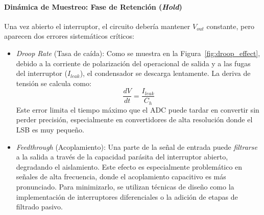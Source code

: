 \paragraph{Dinámica de Muestreo: Fase de Retención (\textit{Hold})}
Una vez abierto el interruptor, el circuito debería mantener $V_{out}$ constante, pero aparecen dos errores sistemáticos críticos:
\begin{itemize}
    \item \emph{Droop Rate} (Tasa de caída): Como se muestra en la Figura~\ref{fig:droop_effect}, debido a la corriente de polarización del operacional de salida y a las fugas del interruptor ($I_{leak}$), el condensador se descarga lentamente. La deriva de tensión se calcula como:
    \begin{equation}
        \frac{dV}{dt} = \frac{I_{leak}}{C_h}
    \end{equation}
    Este error limita el tiempo máximo que el ADC puede tardar en convertir sin perder precisión, especialmente en convertidores de alta resolución donde el LSB es muy pequeño.


    \item \emph{Feedthrough} (Acoplamiento): Una parte de la señal de entrada puede \emph{filtrarse} a la salida a través de la capacidad parásita del interruptor abierto, degradando el aislamiento. Este efecto es especialmente problemático en señales de alta frecuencia, donde el acoplamiento capacitivo es más pronunciado. Para minimizarlo, se utilizan técnicas de diseño como la implementación de interruptores diferenciales o la adición de etapas de filtrado pasivo.
\end{itemize}

\begin{marginfigure}
    \centering
    \shorthandoff{>}
    \caption[Efecto de la tasa de caída (droop) en la retención.]{Efecto de la tasa de caída (\textit{droop}) durante la fase de retención. Este error limita el tiempo máximo que el ADC puede tardar en convertir sin perder precisión.}\label{fig:droop_effect}
\end{marginfigure}

